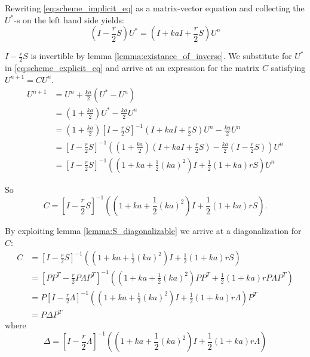 Rewriting \eqref{eq:scheme_implicit_eq} as a matrix-vector equation
and collecting the \( U^* \)-s on the left hand side yields:
\begin{equation}
  \left(I - \frac{r}{2}S\right)U^* = \left(I + kaI + \frac{r}{2}S\right) U^n
\end{equation}

\( I - \frac{r}{2}S \) is invertible
by lemma \ref{lemma:existance_of_inverse}.
We substitute for \( U^* \)
in \eqref{eq:scheme_explicit_eq}
and arrive at an expression for the matrix \( C \)
satisfying \( U^{n+1} = C U^n \).
\begin{align*}
  U^{n+1} &= U^n + \frac{ka}{2}\left(U^*  - U^n\right) \\
          &= \left(1 + \frac{ka}{2}\right) U^* - \frac{ka}{2}U^n \\
          &= \left(1 + \frac{ka}{2}\right) {\left[I - \frac{r}{2}S\right]}^{-1} \left(I + kaI + \frac{r}{2}S\right) U^n - \frac{ka}{2}U^n \\
          &= {\left[I - \frac{r}{2}S\right]}^{-1} \left(\left(1 + \frac{ka}{2}\right)\left(I + kaI + \frac{r}{2}S\right) - \frac{ka}{2}\left(I-\frac{r}{2}S\right)\right) U^n \\
          &= {\left[I - \frac{r}{2}S\right]}^{-1} \left( \left(1+ka+\frac{1}{2}(ka)^2\right)I + \frac{1}{2}\left(1+ka\right)rS\right) U^n
\end{align*}

So
\begin{equation}
    C = {\left[I - \frac{r}{2}S\right]}^{-1} \left( \left(1+ka+\frac{1}{2}(ka)^2\right)I + \frac{1}{2}\left(1+ka\right)rS\right).
  \end{equation}

By exploiting lemma \ref{lemma:S_diagonalizable} we arrive at a diagonalization for \( C \):
\begin{align*}
  C &= {\left[I - \frac{r}{2}S\right]}^{-1} \left( \left(1+ka+\frac{1}{2}(ka)^2\right)I + \frac{1}{2}\left(1+ka\right)rS\right) \\
    &= {\left[PP^T - \frac{r}{2}P\Lambda P^T\right]}^{-1} \left( \left(1+ka+\frac{1}{2}(ka)^2\right)PP^T + \frac{1}{2}\left(1+ka\right)r P\Lambda P^T\right) \\
    &= P{\left[I - \frac{r}{2}\Lambda \right]}^{-1} \left( \left(1+ka+\frac{1}{2}(ka)^2\right)I + \frac{1}{2}\left(1+ka\right)r \Lambda \right) P^T \\
    &= P \Delta P^T
\end{align*}
where
\begin{equation}
    \Delta = {\left[I - \frac{r}{2}\Lambda \right]}^{-1} \left( \left(1+ka+\frac{1}{2}(ka)^2\right)I + \frac{1}{2}\left(1+ka\right)r \Lambda \right)
\end{equation}

